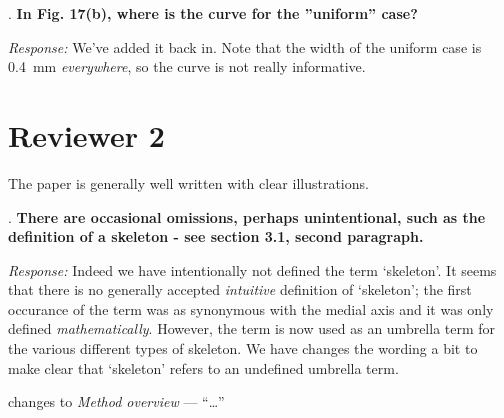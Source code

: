 \documentclass[5p,twocolumn,10pt,times]{elsarticle}
\theoremstyle{definition}
\newcommand{\stkout}[1]{\ifmmode\text{\sout{\ensuremath{#1}}}\else\sout{#1}\fi}
\newcommand{\revise}[2]{\noindent{\color{red}{\stkout{#1}}}\noindent{\color{blue}{#2}}}
\newcommand{\commits}[1]{{\bf\begin{alltt} {#1}\end{alltt}}}
\renewcommand{\commits}[1]{}
\newcommand\paper[2]{\par changes to \emph{#1} --- ``#2'' }
\renewcommand\paper[2]{\par changes to \emph{#1} --- ``\dots'' }
\newcommand\Que[1]{%
   \leavevmode\par
   \stepcounter{question}
   \noindent
   \thequestion. {\bf#1}\par}
\newcounter{question}
\numberwithin{question}{section}
\newcommand\Ans[2][]{%
    \leavevmode\par\noindent
   {%
    {\it Response:} \textbf{#1}#2\par}}
\begin{document}
\Que{
In Fig. 17(b), where is the curve for the ”uniform” case?
}
\Ans{
We've added it back in.
Note that the width of the uniform case is \SI{0.4}{\milli\meter} \emph{everywhere}, so the curve is not really informative.
}
\commits{e5f3649455c73c8146e8d07cce13bc1e89d84cbb}



























\section{Reviewer 2}
The paper is generally well written with clear illustrations. 




\Que{
There are occasional omissions, perhaps unintentional, such as the definition of a skeleton - see section 3.1, second paragraph. 
}
\Ans{
Indeed we have intentionally not defined the term `skeleton'.
It seems that there is no generally accepted \emph{intuitive} definition of `skeleton';
the first occurance of the term was as synonymous with the medial axis and it was only defined \emph{mathematically}.
However, the term is now used as an umbrella term for the various different types of skeleton.
We have changes the wording a bit to make clear that `skeleton' refers to an undefined umbrella term.
}
\commits{5356492b5a9a690228ffdb6a6a26cf10d099a7d4}
\paper{Method overview}{
Our method starts with computing \revise{the}{a type of} skeleton of the input polygon based on the medial axis transform (MAT), a strategy that has been commonly used for generating contour-parallel toolpaths~\cite{eiamsa2003toward}. 
}
\end{document}
